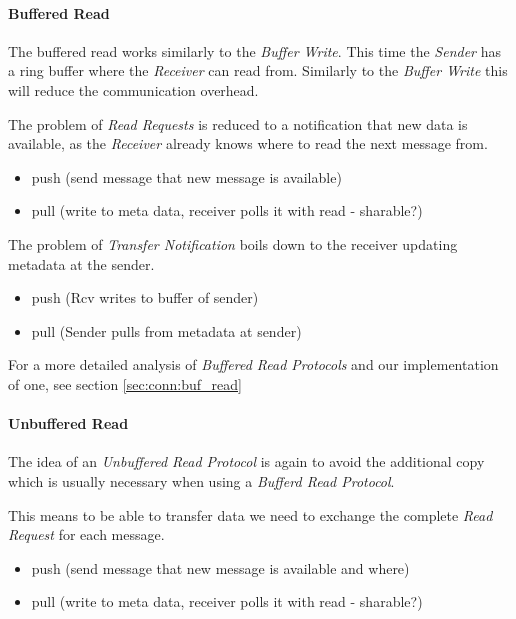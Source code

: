 \paragraph{Buffered Read}


The buffered read works similarly to the \emph{Buffer Write}. This time the \emph{Sender} has a ring buffer where the 
\emph{Receiver} can read from. Similarly to the \emph{Buffer Write} this will reduce the communication overhead.

The problem of \emph{Read Requests} is reduced to a notification that new data is available, as the \emph{Receiver} already
knows where to read the next message from.

\begin{itemize}
  \item push (send message that new message is available)
  \item pull (write to meta data, receiver polls it with read - sharable?)
\end{itemize}


The problem of \emph{Transfer Notification} boils down to the receiver updating metadata at the sender.

\begin{itemize}
  \item push (Rcv writes to buffer of sender)
  \item pull (Sender pulls from metadata at sender)
\end{itemize}

For a more detailed analysis of \emph{Buffered Read Protocols} and our implementation of one, see section \ref{sec:conn:buf_read}

\paragraph{Unbuffered Read}
The idea of an \emph{Unbuffered Read Protocol} is again to avoid the additional copy which is usually necessary when using a
\emph{Bufferd Read Protocol}. 

This means to be able to transfer data we need to exchange the complete \emph{Read Request} for each message. 

\begin{itemize}
  \item push (send message that new message is available and where)
  \item pull (write to meta data, receiver polls it with read - sharable?)
\end{itemize}


